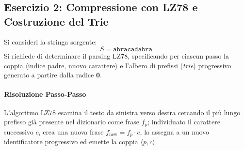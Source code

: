 \FloatBarrier
\subsection{Esercizio 2: Compressione con LZ78 e Costruzione del Trie}
\label{subsec:es2-lz78-compress}

\begin{example}
Si consideri la stringa sorgente:
\begin{equation}
  S = \texttt{abracadabra}
\end{equation}
Si richiede di determinare il parsing LZ78, specificando per ciascun passo la coppia $\langle \text{indice padre}, \, \text{nuovo carattere} \rangle$ e l'albero di prefissi (\textit{trie}) progressivo generato a partire dalla radice $\mathbf{0}$.
\end{example}

\paragraph{Risoluzione Passo-Passo}
L'algoritmo LZ78 esamina il testo da sinistra verso destra cercando il pi\`u lungo prefisso gi\`a presente nel dizionario come frase $f_p$; individuato il carattere successivo $c$, crea una nuova frase $f_{\text{new}} = f_p \cdot c$, la assegna a un nuovo identificatore progressivo ed emette la coppia $\langle p, c \rangle$.

